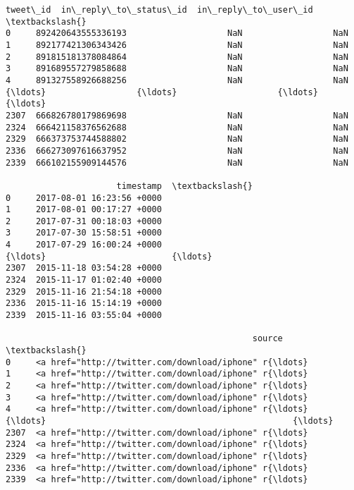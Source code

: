 \documentclass[11pt]{article}
\makeatletter
\newcommand{\boxspacing}{\kern\kvtcb@left@rule\kern\kvtcb@boxsep}
\newcommand{\prompt}[4]{
        {\ttfamily\llap{{\color{#2}[#3]:\hspace{3pt}#4}}\vspace{-\baselineskip}}
    }
\makeatother
\begin{document}
            \begin{tcolorbox}[breakable, size=fbox, boxrule=.5pt, pad at break*=1mm, opacityfill=0]
\prompt{Out}{outcolor}{18}{\boxspacing}
\begin{Verbatim}[commandchars=\\\{\}]
                tweet\_id  in\_reply\_to\_status\_id  in\_reply\_to\_user\_id  \textbackslash{}
0     892420643555336193                    NaN                  NaN
1     892177421306343426                    NaN                  NaN
2     891815181378084864                    NaN                  NaN
3     891689557279858688                    NaN                  NaN
4     891327558926688256                    NaN                  NaN
{\ldots}                  {\ldots}                    {\ldots}                  {\ldots}
2307  666826780179869698                    NaN                  NaN
2324  666421158376562688                    NaN                  NaN
2329  666373753744588802                    NaN                  NaN
2336  666273097616637952                    NaN                  NaN
2339  666102155909144576                    NaN                  NaN

                      timestamp  \textbackslash{}
0     2017-08-01 16:23:56 +0000
1     2017-08-01 00:17:27 +0000
2     2017-07-31 00:18:03 +0000
3     2017-07-30 15:58:51 +0000
4     2017-07-29 16:00:24 +0000
{\ldots}                         {\ldots}
2307  2015-11-18 03:54:28 +0000
2324  2015-11-17 01:02:40 +0000
2329  2015-11-16 21:54:18 +0000
2336  2015-11-16 15:14:19 +0000
2339  2015-11-16 03:55:04 +0000

                                                 source  \textbackslash{}
0     <a href="http://twitter.com/download/iphone" r{\ldots}
1     <a href="http://twitter.com/download/iphone" r{\ldots}
2     <a href="http://twitter.com/download/iphone" r{\ldots}
3     <a href="http://twitter.com/download/iphone" r{\ldots}
4     <a href="http://twitter.com/download/iphone" r{\ldots}
{\ldots}                                                 {\ldots}
2307  <a href="http://twitter.com/download/iphone" r{\ldots}
2324  <a href="http://twitter.com/download/iphone" r{\ldots}
2329  <a href="http://twitter.com/download/iphone" r{\ldots}
2336  <a href="http://twitter.com/download/iphone" r{\ldots}
2339  <a href="http://twitter.com/download/iphone" r{\ldots}


\end{Verbatim}
\end{tcolorbox}
\end{document}
